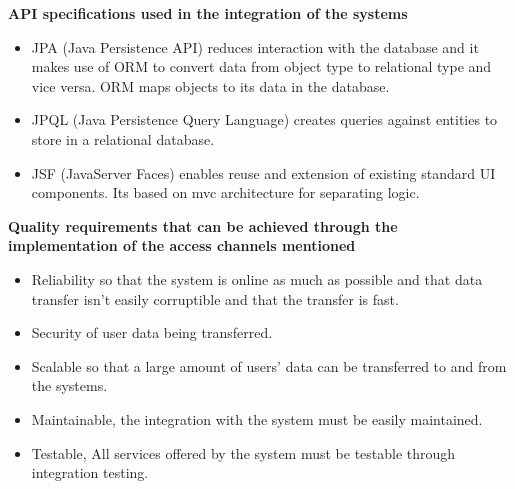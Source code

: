 \documentclass[a4paper]{article}
\begin{document}
\textbf{API specifications used in the integration of the systems}
\begin{itemize}
	\item JPA (Java Persistence API) reduces interaction with the database and it makes use of ORM to convert data from object type to relational type and vice versa. ORM maps objects to its data in the database.
	\item JPQL (Java Persistence Query Language) creates queries against entities to store in a relational database.
	\item JSF (JavaServer Faces) enables reuse and extension of existing standard UI components. Its based on mvc architecture for separating logic.
\end{itemize}
\textbf{Quality requirements that can be achieved through the implementation of the access channels mentioned}
\begin{itemize}
	\item Reliability so that the system is online as much as possible and that data transfer isn’t easily corruptible and that the transfer is fast.
	\item Security of user data being transferred.
	\item Scalable so that a large amount of users’ data can be transferred to and from the systems.
	\item Maintainable, the integration with the system must be easily maintained.
	\item Testable, All services offered by the system must be testable through integration testing.
\end{itemize}
\end{document}
